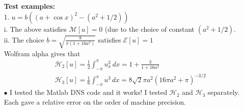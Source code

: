 \documentclass[11pt]{article}
\newcommand{\vsp}[1]{\vspace{#1 pc} \noindent}
\newcommand{\seclabel}[1]{\vsp{1} {\bf#1:}}
\newcommand{\dx}{\, dx}
\newcommand{\En}{\mathcal{E}}
\newcommand{\Mo}{\mathcal{M}}
\newcommand{\Ham}{\mathcal{H}}
\newcommand{\Hthree}{\Ham_{3}}
\newcommand{\Htwo}{\Ham_{2}}
\begin{document}
\seclabel{Test examples} \\
1. $u = b \left( (a+\cos{x})^2 - (a^2+1/2) \right)$ \\
i. The above satisfies $\Mo[u] = 0$ (due to the choice of constant $(a^2 + 1/2)$. \\
ii. The choice $b = \sqrt{ \frac{8}{\pi(1+16 a^2)}}$ satisfies $\En[u] = 1$ \\
Wolfram alpha gives that
\begin{align}
&\Htwo[u] = \frac{1}{2} \int_{-\pi}^{\pi} u_x^2 \dx = 1 + \frac{3}{1+16 a^2} \\
&\Hthree[u] = \frac{1}{6} \int_{-\pi}^{\pi} u^3 \dx = 8 \sqrt{2} \pi a^2 \left( 16 \pi a^2 + \pi \right)^{-3/2}
\end{align}
$\bullet$ I tested the Matlab DNS code and it works! I tested $\Htwo$ and $\Hthree$ separately. Each gave a relative error on the order of machine precision.
\end{document}
